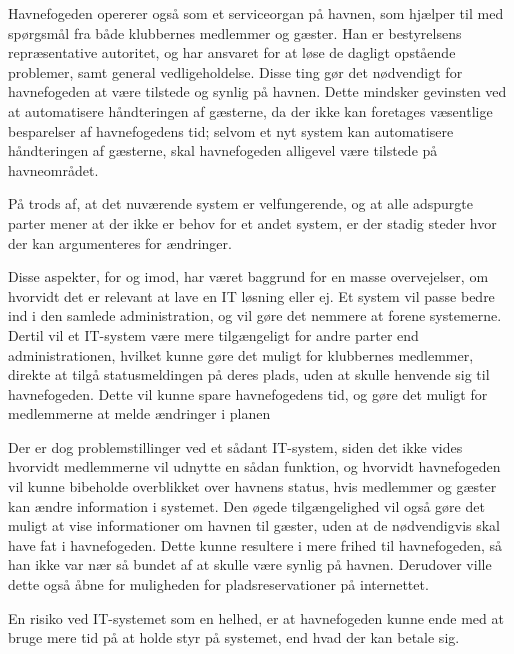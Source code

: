 Havnefogeden opererer også som et serviceorgan på havnen, som hjælper til med spørgsmål fra både klubbernes medlemmer og gæster. Han er bestyrelsens repræsentative autoritet, og har ansvaret for at løse de dagligt opstående problemer, samt general vedligeholdelse. Disse ting gør det nødvendigt for havnefogeden at være tilstede og synlig på havnen. Dette mindsker gevinsten ved at automatisere håndteringen af gæsterne, da der ikke kan foretages væsentlige besparelser af havnefogedens tid; selvom et nyt system kan automatisere håndteringen af gæsterne, skal havnefogeden alligevel være tilstede på havneområdet.


På trods af, at det nuværende system er velfungerende, og at alle adspurgte parter mener at der ikke er behov for et andet system, er der stadig steder hvor der kan argumenteres for ændringer.


Disse aspekter, for og imod, har været baggrund for en masse overvejelser, om hvorvidt det er relevant at lave en IT løsning eller ej. Et system vil passe bedre ind i den samlede administration, og vil gøre det nemmere at forene systemerne. Dertil vil et IT-system være mere tilgængeligt for andre parter end administrationen, hvilket kunne gøre det muligt for klubbernes medlemmer, direkte at tilgå statusmeldingen på deres plads, uden at skulle henvende sig til havnefogeden. Dette vil kunne spare havnefogedens tid, og gøre det muligt for medlemmerne at melde ændringer i planen 

Der er dog problemstillinger ved et sådant IT-system, siden det ikke vides hvorvidt medlemmerne vil udnytte en sådan funktion, og hvorvidt havnefogeden vil kunne bibeholde overblikket over havnens status, hvis medlemmer og gæster kan ændre information i systemet. Den øgede tilgængelighed vil også gøre det muligt at vise informationer om havnen til gæster, uden at de nødvendigvis skal have fat i havnefogeden. Dette kunne resultere i mere frihed til havnefogeden, så han ikke var nær så bundet af at skulle være synlig på havnen. Derudover ville dette også åbne for muligheden for pladsreservationer på internettet.

En risiko ved IT-systemet som en helhed, er at havnefogeden kunne ende med at bruge mere tid på at holde styr på systemet, end hvad der kan betale sig.

